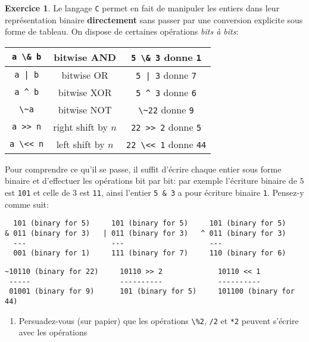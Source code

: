 \documentclass[french,a4paper]{article}
\theoremstyle{definition}
\newtheorem{exercise}{Exercice}
\theoremstyle{remark}
\newcommand{\shell}[1]{\lstinline[style=sh]|#1|}
\newcommand{\inlinec}[1]{\lstinline[style=C]°#1°}
\begin{document}
\begin{exercise}
  Le langage {\tt C} permet en fait de manipuler les entiers dans leur
  représentation binaire {\bf directement} sans passer par une
  conversion explicite sous forme de tableau. On dispose de certaines
  opérations {\em bits à bits}:
  \begin{center}
    \begin{tabular}{|c|c|c|}
      \hline%
      {\inlinec{a \& b}} & bitwise AND
      & {\inlinec{5 \& 3} donne \inlinec{1}} \\
      \hline%
      {\inlinec{a | b}} & bitwise OR
      & {\inlinec{5 | 3} donne \inlinec{7}} \\
      \hline%
      {\inlinec{a ^ b}} & bitwise XOR
      & {\inlinec{5 ^ 3} donne \inlinec{6}} \\
      \hline%
      {\inlinec{\~a}} & bitwise NOT
      & {\inlinec{\~22} donne \inlinec{9}} \\
      \hline%
      {\inlinec{a >> n}} & right shift by $n$
      & {\inlinec{22 >> 2} donne \inlinec{5}} \\
      \hline%
      {\inlinec{a \<< n}} & left shift by $n$
      & {\inlinec{22 \<< 1} donne \inlinec{44}} \\
      \hline%
    \end{tabular}
  \end{center}
  Pour comprendre ce qu'il se passe, il suffit d'écrire chaque entier
  sous forme binaire et d'effectuer les opérations bit par bit: par
  exemple l'écriture binaire de $5$ est \shell{101} et celle de $3$
  est \shell{11}, ainsi l'entier \inlinec{5 & 3} a pour écriture
  binaire \shell{1}. Pensez-y comme suit:
\begin{verbatim}
  101 (binary for 5)     101 (binary for 5)     101 (binary for 5)
& 011 (binary for 3)   | 011 (binary for 3)   ^ 011 (binary for 3)
  ---                    ---                    ---
  001 (binary for 1)     111 (binary for 7)     110 (binary for 6)
\end{verbatim}
\begin{verbatim}
~10110 (binary for 22)     10110 >> 2             10110 << 1
 -----                     ----------             ----------
 01001 (binary for 9)      101 (binary for 5)     101100 (binary for 44)
\end{verbatim}
  \begin{enumerate}[label=(\arabic*)]
  \item Persuadez-vous (sur papier) que les opérations \inlinec{\%2},
    \inlinec{/2} et \inlinec{*2} peuvent s'écrire avec les opérations

\end{enumerate}
\end{exercise}
\end{document}
